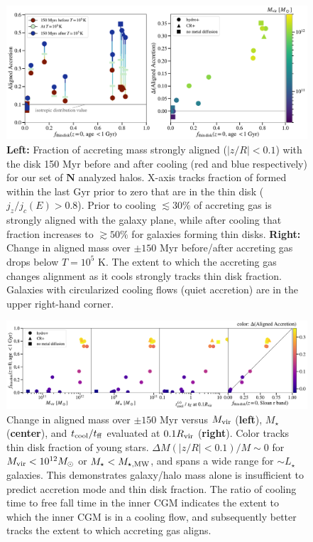 \documentclass[fleqn,usenatbib]{mnras}
\begin{document}
\begin{figure}
    \centering
    \includegraphics[width=\textwidth]{figures/prevalence/aligned_fraction.pdf}
    \caption{
    \textbf{Left:}
    Fraction of accreting mass strongly aligned ($\mid z/R \mid < 0.1$) with the disk 150 Myr before and after cooling (red and blue respectively) for our set of $\mathbf{N}$ analyzed halos.
    X-axis tracks fraction of formed within the last Gyr prior to zero that are in the thin disk ($j_z/j_c(E)>0.8$).
    Prior to cooling $\lesssim 30\%$ of accreting gas is strongly aligned with the galaxy plane,
    while after cooling that fraction increases to $\gtrsim 50\%$ for galaxies forming thin disks.
    \textbf{Right:}
    Change in aligned mass over $\pm 150$ Myr before/after accreting gas drops below $T = 10^5$ K.
    The extent to which the accreting gas changes alignment as it cools strongly tracks thin disk fraction.
    Galaxies with circularized cooling flows (quiet accretion) are in the upper right-hand corner.
    }
    \label{f: prevalence}
\end{figure}

\begin{figure}
    \centering
    \includegraphics[width=\textwidth]{figures/prevalence/aligned_fraction_vs_galaxy_props.pdf}
    \caption{
    Change in aligned mass over $\pm 150$ Myr versus $M_{\rm vir}$ (\textbf{left}), $M_\star$ (\textbf{center}), and $t_{\rm cool}/t_{\rm ff}$ evaluated at $0.1 R_{\rm vir}$ (\textbf{right}).
    Color tracks thin disk fraction of young stars.
    $\Delta M(\mid z/R \mid<0.1)/M \sim 0$ for $M_{\rm vir} < 10^{12} M_\odot$ or $M_\star < M_{\star, {\rm MW}}$, and spans a wide range for $\sim L_\star$ galaxies.
    This demonstrates galaxy/halo mass alone is insufficient to predict accretion mode and thin disk fraction.
    The ratio of cooling time to free fall time in the inner CGM indicates the extent to which the inner CGM is in a cooling flow, and subsequently better tracks the extent to which accreting gas aligns.
    }
    \label{f: prevalence vs galaxy properties}
\end{figure}
\end{document}
